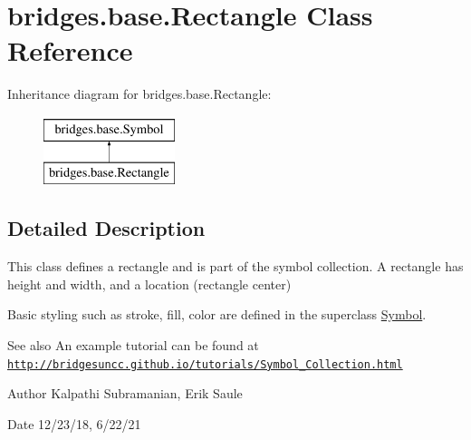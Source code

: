 \hypertarget{classbridges_1_1base_1_1_rectangle}{}\section{bridges.\+base.\+Rectangle Class Reference}
\label{classbridges_1_1base_1_1_rectangle}
Inheritance diagram for bridges.\+base.\+Rectangle\+:\begin{figure}[H]
\begin{center}
\leavevmode
\includegraphics[height=2.000000cm]{classbridges_1_1base_1_1_rectangle}
\end{center}
\end{figure}


\subsection{Detailed Description}
This class defines a rectangle and is part of the symbol collection. A rectangle has height and width, and a location (rectangle center) 

Basic styling such as stroke, fill, color are defined in the superclass \hyperlink{classbridges_1_1base_1_1_symbol}{Symbol}.

\begin{DoxySeeAlso}{See also}
An example tutorial can be found at \href{http://bridgesuncc.github.io/tutorials/Symbol_Collection.html}{\tt http\+://bridgesuncc.\+github.\+io/tutorials/\+Symbol\+\_\+\+Collection.\+html} 
\end{DoxySeeAlso}
\begin{DoxyAuthor}{Author}
Kalpathi Subramanian, Erik Saule 
\end{DoxyAuthor}
\begin{DoxyDate}{Date}
12/23/18, 6/22/21 
\end{DoxyDate}
